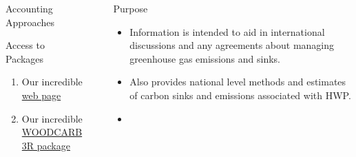 \documentclass[final]{beamer}\usepackage[]{graphicx}\usepackage[]{color}
\newlength{\sepwid}
\newlength{\onecolwid}
\newlength{\twocolwid}
\begin{document}
\begin{frame}[t]
\begin{columns}[t]
\begin{column}{\onecolwid}
\begin{block}{Accounting Approaches}
\end{block}
\vfill


\begin{block}{Access to Packages}

\begin{enumerate}
\item Our incredible \href{http://madeitup.com}{web page}
\item Our incredible \href{http://benjones2.github.io/WOODCARB3R/}{WOODCARB3R package}
\end{enumerate}


\end{block}
\vfill


\end{column} %

\begin{column}{\sepwid}\end{column} %

\begin{column}{\twocolwid} %

\begin{columns}[t,totalwidth=\twocolwid] %

\begin{column}{\onecolwid}\vspace{-.6in} %


\begin{block}{Purpose}
\vspace{0ex}
\begin{itemize}
\item Information is intended to aid in international discussions and any agreements about managing greenhouse gas emissions and sinks.
\item Also provides national level methods and estimates of carbon sinks and emissions associated with HWP.
\item
\end{itemize}
\vspace{-1.5ex}
\end{block}


\end{column}
\end{columns}
\end{column}
\end{columns}
\end{frame}
\end{document}
